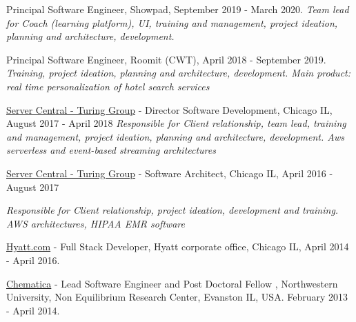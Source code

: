\documentclass[11pt,letterpaper]{article}
\renewenvironment{itemize}{
  \begin{list}{}{
    \setlength{\leftmargin}{1.5em}
  }
}{
  \end{list}
}
\begin{document}
\begin{itemize}
% 

\item Principal Software Engineer, Showpad,  September 2019 - March 2020. 
\textit{Team lead for Coach (learning platform), UI, training and management, project ideation, planning and architecture, development.}


\item Principal Software Engineer, Roomit (CWT),  April 2018 - September 2019. 
\textit{Training, project ideation, planning and architecture, development. Main product: real time personalization of hotel search services}

\item \href{http://www.turinggroup.com}{Server Central - Turing Group} - Director Software Development,  Chicago  IL, August 2017 - April 2018 
\textit{Responsible for Client relationship, team lead, training and management, project ideation, planning and architecture, development. Aws serverless and event-based streaming architectures}

\item \href{http://www.turinggroup.com}{Server Central - Turing Group} - Software Architect,  Chicago  IL, April 2016 - August 2017 

\textit{Responsible for Client relationship, project ideation, development and training.  AWS architectures, HIPAA EMR software}
\item \href{http://www.hyatt.com}{Hyatt.com} -  Full Stack Developer, Hyatt corporate office,  Chicago  IL, April 2014 - April 2016. 
\item \href{http://www.chematica.net}{Chematica} - Lead Software Engineer and Post Doctoral Fellow , Northwestern University, Non Equilibrium Research Center, Evanston IL, USA. February 2013 - April 2014.

% 
\end{itemize}
\end{document}
